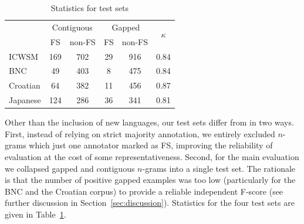 \documentclass[11pt,letterpaper]{article}
\newcommand{\z}{\phantom{0}}
\newcommand{\tabref}[2][]{Table#1~\ref{#2}\xspace}
\newcommand{\secref}[2][]{Section#1~\ref{#2}\xspace}
\begin{document}
\begin{table}[!bt]
 
 \begin{center}
   \begin{tabular}{lc@{\,\,\,}cc@{\,\,\,}c@{\,\,\,}c}

       \toprule
       & \multicolumn{2}{c}{Contiguous} & \multicolumn{2}{c}{Gapped} & \multirow{2}{*}{$\kappa$}\\
       \cmidrule(lr){2-3}\cmidrule(lr){4-5}
			& FS & non-FS & FS & non-FS &  \\
			 \midrule
			ICWSM    & 169  & 702 & 29 & 916 & 0.84 \\
			BNC      & \z49 & 403 & \z8& 475 & 0.84 \\
			Croatian & \z64 & 382 & 11 & 456 & 0.87 \\
			Japanese & 124  & 286 & 36 & 341 & 0.81\\
       \bottomrule
 \end{tabular}
  \caption{ Statistics for test sets }
	 \label{tab:stats}

 \end{center}

 \end{table}

Other than the inclusion of new languages, our test sets differ from  in two ways. First, instead of relying on strict majority annotation, we entirely excluded $n$-grams which just one annotator marked as FS, improving the reliability of evaluation at the cost of some representativeness.  Second, for the main evaluation we collapsed gapped and contiguous $n$-grams into a single test set. The rationale is that the number of positive gapped examples was too low (particularly for the BNC and the Croatian corpus) to provide a reliable independent F-score (see further discussion in \secref{sec:discussion}). Statistics for the four test sets are given in \tabref{tab:stats}.
\end{document}
